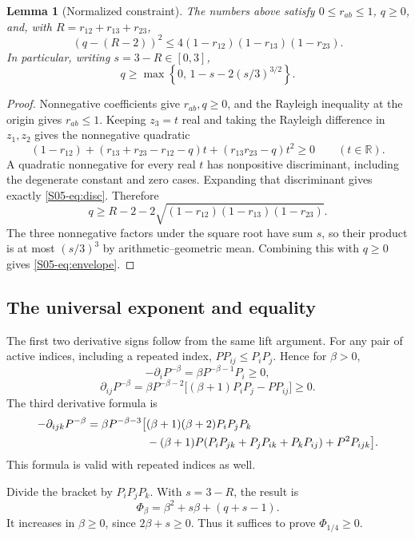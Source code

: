 \documentclass[11pt,a4paper]{article}
\newtheorem{lemma}[theorem]{Lemma}
\theoremstyle{definition}\newtheorem{definition}[theorem]{Definition}
\theoremstyle{remark}\newtheorem{remark}[theorem]{Remark}
\newcommand{\R}{\mathbb R}\newcommand{\C}{\mathbb C}\newcommand{\N}{\mathbb N}
\numberwithin{equation}{section}
\begin{document}
\begin{lemma}[Normalized constraint]\label{S05-lem:constraint}
The numbers above satisfy $0\le r_{ab}\le1$, $q\ge0$, and, with $R=r_{12}+r_{13}+r_{23}$,
\begin{equation}\label{S05-eq:disc}
 (q-(R-2))^2\le4(1-r_{12})(1-r_{13})(1-r_{23}).
\end{equation}
In particular, writing $s=3-R\in[0,3]$,
\begin{equation}\label{S05-eq:envelope}
 q\ge\max\left\{0,\,1-s-2(s/3)^{3/2}\right\}.
\end{equation}
\end{lemma}
\begin{proof}
Nonnegative coefficients give $r_{ab},q\ge0$, and the Rayleigh inequality at the origin gives $r_{ab}\le1$. Keeping $z_3=t$ real and taking the Rayleigh difference in $z_1,z_2$ gives the nonnegative quadratic
\[
 (1-r_{12})+(r_{13}+r_{23}-r_{12}-q)t+(r_{13}r_{23}-q)t^2\ge0
 \qquad(t\in\R).
\]
A quadratic nonnegative for every real $t$ has nonpositive discriminant, including the degenerate constant and zero cases. Expanding that discriminant gives exactly \eqref{S05-eq:disc}. Therefore
\[
 q\ge R-2-2\sqrt{(1-r_{12})(1-r_{13})(1-r_{23})}.
\]
The three nonnegative factors under the square root have sum $s$, so their product is at most $(s/3)^3$ by arithmetic--geometric mean. Combining this with $q\ge0$ gives \eqref{S05-eq:envelope}.
\end{proof}

\subsection{The universal exponent and equality}\label{S05-sec-4}
The first two derivative signs follow from the same lift argument. For any pair of active indices, including a repeated index, $PP_{ij}\le P_iP_j$. Hence for $\beta>0$,
\[
 -\partial_iP^{-\beta}=\beta P^{-\beta-1}P_i\ge0,
\]
\[
 \partial_{ij}P^{-\beta}
 =\beta P^{-\beta-2}\big[(\beta+1)P_iP_j-PP_{ij}\big]\ge0.
\]
The third derivative formula is
\begin{align}\label{S05-eq:third}
 -\partial_{ijk}P^{-\beta}
 =\beta P^{-\beta-3}\big[& (\beta+1)(\beta+2)P_iP_jP_k\notag\\
 &-(\beta+1)P(P_iP_{jk}+P_jP_{ik}+P_kP_{ij})+P^2P_{ijk}\big].
\end{align}
This formula is valid with repeated indices as well.

Divide the bracket by $P_iP_jP_k$. With $s=3-R$, the result is
\begin{equation}\label{S05-eq:betaform}
 \Phi_\beta=\beta^2+s\beta+(q+s-1).
\end{equation}
It increases in $\beta\ge0$, since $2\beta+s\ge0$. Thus it suffices to prove $\Phi_{1/4}\ge0$.
\end{document}
